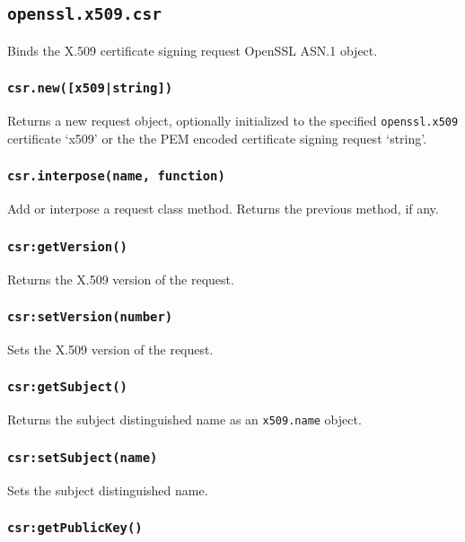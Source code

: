 \documentclass[11pt, oneside]{memoir}
\newcommand*{\fn}[1]{\texttt{#1}\xspace}
\newcommand*{\module}[1]{\texttt{#1}\xspace}
\newcounter{toccols}
\newenvironment{Module}[1]{
	\subsection{\texttt{#1}}
	\addtocontents{toc}{
		\protect\begin{multicols}{\value{toccols}}
	}
}{
	\addtocontents{toc}{\protect\end{multicols}}
}
\begin{document}
\begin{Module}{openssl.x509.csr}

Binds the X.509 certificate signing request OpenSSL ASN.1 object.

\subsubsection[\fn{csr.new}]{\fn{csr.new([x509|string])}}

Returns a new request object, optionally initialized to the specified \module{openssl.x509} certificate `x509' or the the PEM encoded certificate signing request `string'.

\subsubsection[\fn{csr.interpose}]{\fn{csr.interpose(name, function)}}

Add or interpose a request class method. Returns the previous method, if any.

\subsubsection[\fn{csr:getVersion}]{\fn{csr:getVersion()}}

Returns the X.509 version of the request.

\subsubsection[\fn{car:setVersion}]{\fn{csr:setVersion(number)}}

Sets the X.509 version of the request.

\subsubsection[\fn{csr:getSubject}]{\fn{csr:getSubject()}}

Returns the subject distinguished name as an \module{x509.name} object.

\subsubsection[\fn{csr:setSubject}]{\fn{csr:setSubject(name)}}

Sets the subject distinguished name.

\subsubsection[\fn{csr:getPublicKey}]{\fn{csr:getPublicKey()}}


\end{Module}
\end{document}
